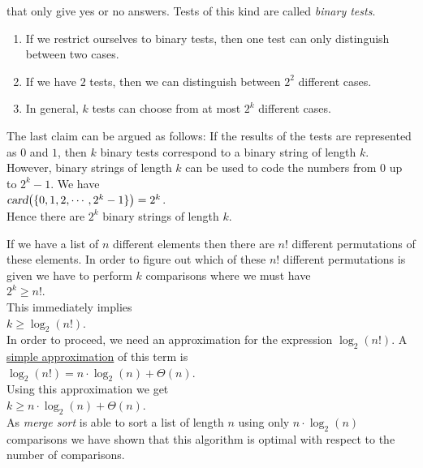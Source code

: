 that only give yes or no answers.  Tests of this kind are called \emph{binary tests}.
\begin{enumerate}
\item If we restrict ourselves to binary tests, then one test can only distinguish between two cases.
\item If we have $2$ tests, then we can distinguish between  $2^2$ different cases.
\item In general, $k$ tests can choose from at most $2^k$ different cases.
\end{enumerate}
The last claim can be argued as follows:  If the results of the tests are represented as
$0$ and $1$, then $k$ binary tests correspond to a binary string of length
$k$.  However, binary strings of length $k$ can be used to code the numbers from $0$ up to
$2^{k}-1$.  We have
\\[0.2cm]
\hspace*{1.3cm}
$\textsl{card}\bigl(\{0,1,2,\cdots, 2^k-1\}\bigr) = 2^k$.
\\[0.2cm]
Hence there are $2^k$ binary strings of length $k$.  

If we have a list of $n$ different elements then there are $n!$ different permutations of these
elements.  In order to figure out which of these $n!$ different permutations is given we have to
perform $k$ comparisons where we must have
\\[0.2cm]
\hspace*{1.3cm}
$2^k \geq n!$.
\\[0.2cm]
This immediately implies
\\[0.2cm]
\hspace*{1.3cm}
$k \geq \log_2(n!)$.
\\[0.2cm]
In order to proceed, we need an approximation for the expression $\log_2(n!)$.  
A \href{http://en.wikipedia.org/wiki/Stirling's_approximation}{simple approximation} of this term is
\\[0.2cm]
\hspace*{1.3cm}
$\log_2(n!) = n \cdot \log_2(n) + \Theta(n)$.
\\[0.2cm]
Using this approximation we get
\\[0.2cm]
\hspace*{1.3cm}
$k \geq n \cdot \log_2(n) + \Theta(n)$.
\\[0.2cm]
As \emph{merge sort} is able to sort a list of length $n$ using only $n \cdot \log_2(n)$ comparisons
we have shown that this algorithm is optimal with respect to the number of comparisons.


